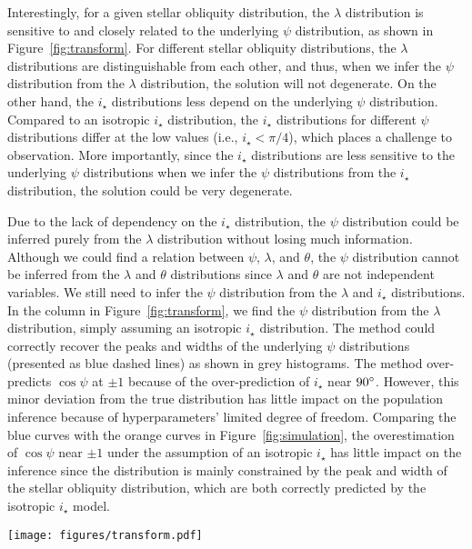 \documentclass[twocolumn,times]{aastex631}
\begin{document}
Interestingly, for a given stellar obliquity distribution, the $\lambda$ distribution is sensitive to and closely related to the underlying $\psi$ distribution, as shown in Figure~\ref{fig:transform}. For different stellar obliquity distributions, the $\lambda$ distributions are distinguishable from each other, and thus, when we infer the $\psi$ distribution from the $\lambda$ distribution, the solution will not degenerate.
On the other hand, the $i_\star$ distributions less depend on the underlying $\psi$ distribution. Compared to an isotropic $i_\star$ distribution, the $i_\star$ distributions for different $\psi$ distributions differ at the low values (i.e., $i_\star < \pi/4$), which places a challenge to observation. More importantly, since the $i_\star$ distributions are less sensitive to the underlying $\psi$ distributions when we infer the $\psi$ distributions from the $i_\star$ distribution, the solution could be very degenerate.

Due to the lack of dependency on the $i_\star$ distribution, the $\psi$ distribution could be inferred purely from the $\lambda$ distribution without losing much information. Although we could find a relation between $\psi$, $\lambda$, and $\theta$, the $\psi$ distribution cannot be inferred from the $\lambda$ and $\theta$ distributions since $\lambda$ and $\theta$ are not independent variables. We still need to infer the $\psi$ distribution from the $\lambda$ and $i_\star$ distributions.
In the  column in Figure~\ref{fig:transform}, we find the $\psi$ distribution from the $\lambda$ distribution, simply assuming an isotropic $i_\star$ distribution. The method could correctly recover the peaks and widths of the underlying $\psi$ distributions (presented as blue dashed lines) as shown in grey histograms. The method over-predicts $\cos{\psi}$ at $\pm 1$ because of the over-prediction of $i_\star$ near $90\mbox{$^\circ$}$. However, this minor deviation from the true distribution has little impact on the population inference because of hyperparameters' limited degree of freedom. Comparing the blue curves with the orange curves in Figure~\ref{fig:simulation}, the overestimation of $\cos{\psi}$ near $\pm1$ under the assumption of an isotropic $i_\star$ has little impact on the inference since the distribution is mainly constrained by the peak and width of the stellar obliquity distribution, which are both correctly predicted by the isotropic $i_\star$ model.


\begin{figure*}[ht!]
    \texttt{[image: figures/transform.pdf]}
    \caption{Simulated $\cos{\psi}$ distributions ( column) and their corresponding sky-projected stellar obliquity $\lambda$ ( column) and stellar inclination $i_\star$ ( column) distributions. The inferred $\cos{\psi}$ distributions assuming isotropic stellar inclinations are shown in the  column. The random samplings of $\lambda$ and $i_\star$ out of the $\cos{\psi}$ distributions are shown as grey histograms, and the numerical solutions are shown as blue curves.}
    \label{fig:transform}
\end{figure*}
\end{document}
